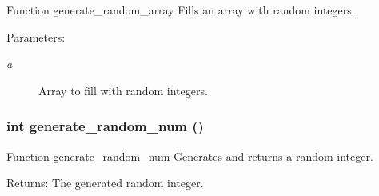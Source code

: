 Function generate\_\-random\_\-array Fills an array with random integers. \begin{Desc}
\item[Parameters:]
\begin{description}
\item[{\em a}]Array to fill with random integers. \end{description}
\end{Desc}
\subsubsection{\setlength{\rightskip}{0pt plus 5cm}int generate\_\-random\_\-num ()}\label{array__functions_8c_f406e12db8e6a44e02db29bc8525beb4}


Function generate\_\-random\_\-num Generates and returns a random integer. \begin{Desc}
\item[Returns:]The generated random integer. \end{Desc}
